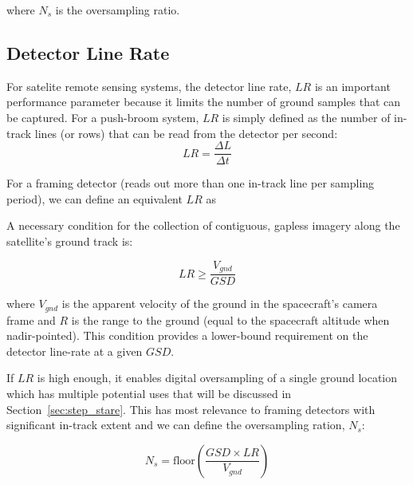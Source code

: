 \documentclass[10pt,journal]{IEEEtran}  %
\begin{document}
where $N_s$ is the oversampling ratio.


\subsection{Detector Line Rate}
For satelite remote sensing systems, the detector line rate, $LR$ is an important performance parameter because it limits the number of ground samples that can be captured.  For a push-broom system, $LR$ is simply defined as the number of in-track lines (or rows) that can be read from the detector per second:
\begin{equation*}
LR = \frac{\Delta L}{\Delta t}
\end{equation*}

For a framing detector (reads out more than one in-track line per sampling period), we can define an equivalent $LR$ as

A necessary condition for the collection of contiguous, gapless imagery along the satellite's ground track is:

\begin{equation}
    LR \geq\frac{V_{gnd}}{GSD}
\end{equation}

where $V_{gnd}$ is the apparent velocity of the ground in the spacecraft's camera frame and $R$ is the range to the ground (equal to the spacecraft altitude when nadir-pointed).  This condition provides a lower-bound requirement on the detector line-rate at a given $GSD$.  

If $LR$ is high enough, it enables digital oversampling of a single ground location which has multiple potential uses that will be discussed in Section~\ref{sec:step_stare}.  This has most relevance to framing detectors with significant in-track extent and we can define the oversampling ration, $N_s$:

\begin{equation}
    N_s = \text{floor}\left(\frac{GSD \times LR}{V_{gnd}}\right)
\end{equation}


\end{document}
